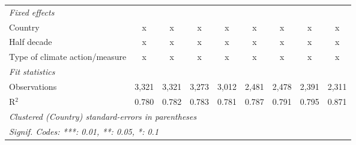 \begin{table}[htbp]
\begin{tabular}{lcccccccc}
      \emph{Fixed effects}\\
      Country                                                               & x            & x            & x            & x       & x            & x             & x             & x\\  
      Half decade                                                           & x            & x            & x            & x       & x            & x             & x             & x\\  
      Type of climate action/measure                                        & x            & x            & x            & x       & x            & x             & x             & x\\  
      \midrule \emph{Fit statistics}\\
      Observations                                                          & 3,321        & 3,321        & 3,273        & 3,012   & 2,481        & 2,478         & 2,391         & 2,311\\  
      R$^2$                                                                 & 0.780        & 0.782        & 0.783        & 0.781   & 0.787        & 0.791         & 0.795         & 0.871\\  
      \midrule
      \multicolumn{9}{l}{\emph{Clustered (Country) standard-errors in parentheses}}\\
      \multicolumn{9}{l}{\emph{Signif. Codes: ***: 0.01, **: 0.05, *: 0.1}}\\
   \end{tabular}
\end{table}


